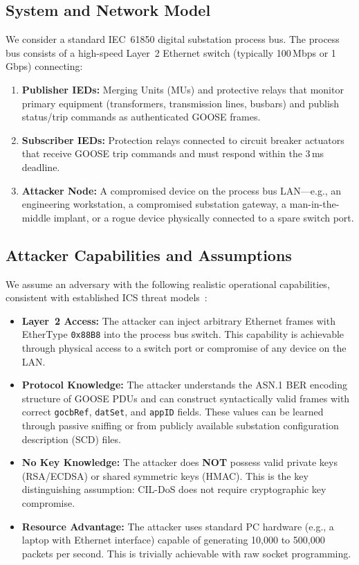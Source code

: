 \documentclass[journal]{IEEEtran}
\begin{document}
\subsection{System and Network Model}
We consider a standard IEC~61850 digital substation process bus. The process bus consists of a high-speed Layer~2 Ethernet switch (typically 100\,Mbps or 1\,Gbps) connecting:
\begin{enumerate}[leftmargin=*]
    \item \textbf{Publisher IEDs:} Merging Units (MUs) and protective relays that monitor primary equipment (transformers, transmission lines, busbars) and publish status/trip commands as authenticated GOOSE frames.
    \item \textbf{Subscriber IEDs:} Protection relays connected to circuit breaker actuators that receive GOOSE trip commands and must respond within the 3\,ms deadline.
    \item \textbf{Attacker Node:} A compromised device on the process bus LAN---e.g., an engineering workstation, a compromised substation gateway, a man-in-the-middle implant, or a rogue device physically connected to a spare switch port.
\end{enumerate}

\subsection{Attacker Capabilities and Assumptions}
We assume an adversary with the following realistic operational capabilities, consistent with established ICS threat models~\cite{khan2021survey, prevelakis2018ics}:
\begin{itemize}[leftmargin=*]
    \item \textbf{Layer~2 Access:} The attacker can inject arbitrary Ethernet frames with EtherType \texttt{0x88B8} into the process bus switch. This capability is achievable through physical access to a switch port or compromise of any device on the LAN.
    \item \textbf{Protocol Knowledge:} The attacker understands the ASN.1 BER encoding structure of GOOSE PDUs and can construct syntactically valid frames with correct \texttt{gocbRef}, \texttt{datSet}, and \texttt{appID} fields. These values can be learned through passive sniffing or from publicly available substation configuration description (SCD) files.
    \item \textbf{No Key Knowledge:} The attacker does \textbf{NOT} possess valid private keys (RSA/ECDSA) or shared symmetric keys (HMAC). This is the key distinguishing assumption: CIL-DoS does not require cryptographic key compromise.
    \item \textbf{Resource Advantage:} The attacker uses standard PC hardware (e.g., a laptop with Ethernet interface) capable of generating 10,000 to 500,000 packets per second. This is trivially achievable with raw socket programming.
\end{itemize}
\end{document}
